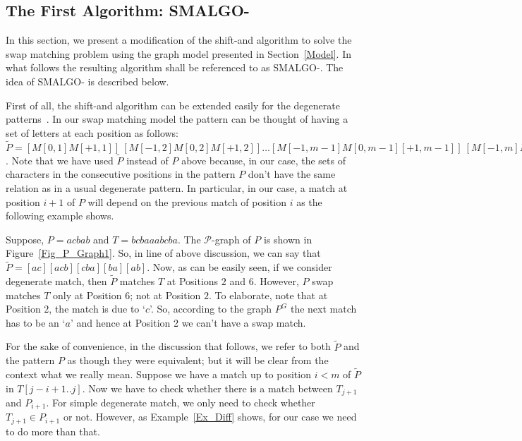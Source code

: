 \documentclass{llncs}
\newcommand{\rom}[1]{\uppercase\expandafter{\romannumeral #1\relax}}
\begin{document}
\subsection{The First Algorithm: SMALGO-\rom{1}}{\label{AIIR}

In this section, we present a modification of  the shift-and algorithm to solve the swap matching problem using the graph model presented in Section~\ref{Model}. In what follows the resulting algorithm shall be referenced to as SMALGO-\rom{1}. The idea of SMALGO-\rom{1} is described below.

 
First of all, the shift-and algorithm can be extended easily for the degenerate patterns~\cite{BG92}. In our swap matching model the pattern can be thought of having a set of letters at each position as follows: $\tilde{P} = [M[0,1]M[+1,1]]~[M[-1,2]M[0,2]M[+1,2]]\ldots[M[-1,m-1]M[0,m-1][+1,m-1]]~[M[-1,m]M[0,m]]$. Note that we have used $\widetilde{P}$ instead of $P$ above because, in our case, the sets of characters in the consecutive positions in the pattern $P$ don't have the same relation as in a usual degenerate pattern. In particular, in our case, a match at position $i+1$ of $P$ will depend on the previous match of position $i$ as the following example shows.


\begin{example}\label{Ex_Diff}
Suppose, $P = acbab$ and $T = bcbaaabcba$. The $\mathcal P$-graph of
$P$ is shown in Figure~\ref{Fig_P_Graph1}. So, in line of above
discussion, we can say that $\widetilde{P} =
[ac][acb][cba][ba][ab]$. Now, as can be easily seen, if we consider
degenerate match, then $\widetilde{P}$ matches $T$ at Positions $2$
and $6$. However, $P$ swap matches $T$ only at Position $6$; not at
Position $2$. To elaborate, note that at Position $2$, the match is
due to `$c$'. So, according to the graph $P^G$ the next match has to
be an `$a$' and hence at Position 2 we can't have a swap match.
\end{example}



For the sake of convenience, in the discussion that
follows, we refer to both $\widetilde{P}$ and the pattern $P$ as
though they were equivalent; but it will be clear from the context
what we really mean. Suppose we have a match up to position $i< m$
of $\widetilde{P}$ in $T[j-i+1..j]$. Now we have to check whether
there is a match between $T_{j+1}$ and $P_{i+1}$. For simple
degenerate match, we only need to check whether $T_{j+1}\in P_{i+1}$
or not. However, as Example~\ref{Ex_Diff} shows, for our case we
need to do more than that. 



}
\end{document}
